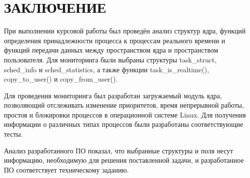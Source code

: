 \part*{ЗАКЛЮЧЕНИЕ}

При выполнении курсовой работы был проведён анализ структур ядра, функций определения принадлежности процесса к процессам реального времени и функций передачи данных между пространством ядра и пространством пользователя. Для мониторинга были выбраны структуры task\_struct, sched\_info и sched\_statistics, а также функции task\_is\_realtime(), copy\_to\_user() и copy\_from\_user().

Для проведения мониторинга был разработан загружаемый модуль ядра, позволяющий отслеживать изменение приоритетов, время непрерывной работы, простоя и блокировки процессов в операционной системе Linux. Для получения информации о различных типах процессов были разработаны соответствующие тесты. 

Анализ разработанного ПО показал, что выбранные структуры и поля несут информацию, необходимую для решения поставленной задачи, и разработанное ПО соответствует техническому заданию.
